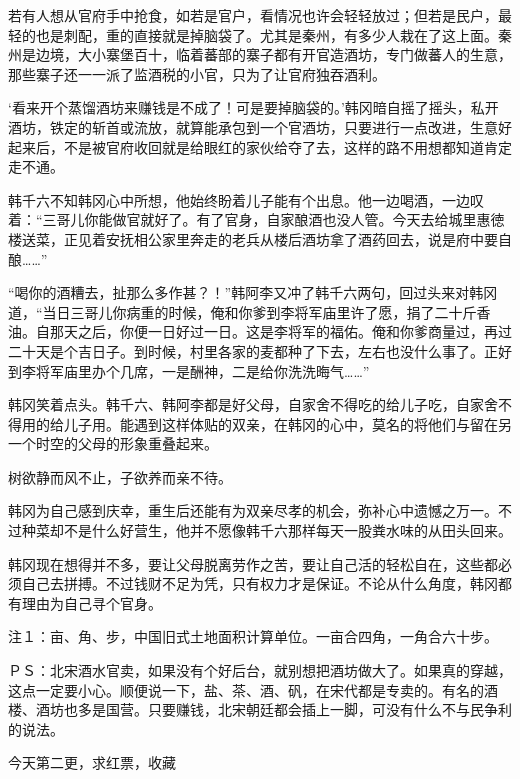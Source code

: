 若有人想从官府手中抢食，如若是官户，看情况也许会轻轻放过；但若是民户，最轻的也是刺配，重的直接就是掉脑袋了。尤其是秦州，有多少人栽在了这上面。秦州是边境，大小寨堡百十，临着蕃部的寨子都有开官造酒坊，专门做蕃人的生意，那些寨子还一一派了监酒税的小官，只为了让官府独吞酒利。

‘看来开个蒸馏酒坊来赚钱是不成了！可是要掉脑袋的。’韩冈暗自摇了摇头，私开酒坊，铁定的斩首或流放，就算能承包到一个官酒坊，只要进行一点改进，生意好起来后，不是被官府收回就是给眼红的家伙给夺了去，这样的路不用想都知道肯定走不通。

韩千六不知韩冈心中所想，他始终盼着儿子能有个出息。他一边喝酒，一边叹着：“三哥儿你能做官就好了。有了官身，自家酿酒也没人管。今天去给城里惠徳楼送菜，正见着安抚相公家里奔走的老兵从楼后酒坊拿了酒药回去，说是府中要自酿……”

“喝你的酒糟去，扯那么多作甚？！”韩阿李又冲了韩千六两句，回过头来对韩冈道，“当日三哥儿你病重的时候，俺和你爹到李将军庙里许了愿，捐了二十斤香油。自那天之后，你便一日好过一日。这是李将军的福佑。俺和你爹商量过，再过二十天是个吉日子。到时候，村里各家的麦都种了下去，左右也没什么事了。正好到李将军庙里办个几席，一是酬神，二是给你洗洗晦气……”

韩冈笑着点头。韩千六、韩阿李都是好父母，自家舍不得吃的给儿子吃，自家舍不得用的给儿子用。能遇到这样体贴的双亲，在韩冈的心中，莫名的将他们与留在另一个时空的父母的形象重叠起来。

树欲静而风不止，子欲养而亲不待。

韩冈为自己感到庆幸，重生后还能有为双亲尽孝的机会，弥补心中遗憾之万一。不过种菜却不是什么好营生，他并不愿像韩千六那样每天一股粪水味的从田头回来。

韩冈现在想得并不多，要让父母脱离劳作之苦，要让自己活的轻松自在，这些都必须自己去拼搏。不过钱财不足为凭，只有权力才是保证。不论从什么角度，韩冈都有理由为自己寻个官身。

注１：亩、角、步，中国旧式土地面积计算单位。一亩合四角，一角合六十步。

ＰＳ：北宋酒水官卖，如果没有个好后台，就别想把酒坊做大了。如果真的穿越，这点一定要小心。顺便说一下，盐、茶、酒、矾，在宋代都是专卖的。有名的酒楼、酒坊也多是国营。只要赚钱，北宋朝廷都会插上一脚，可没有什么不与民争利的说法。

今天第二更，求红票，收藏

